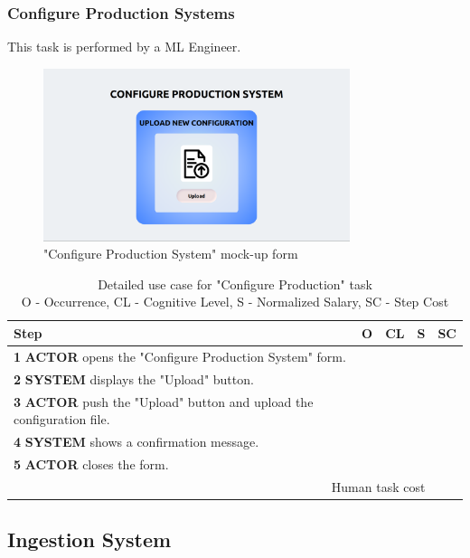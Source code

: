 \subsubsection{Configure Production Systems}
This task is performed by a ML Engineer.

\begin{figure}[H]
\centering
\includegraphics[width=0.8\textwidth]{figures/ui_configure_production.png}
\caption{"Configure Production System" mock-up form}
\end{figure}

\begin{table}[H]
\centering
\begin{tabularx}{\textwidth}{|X|c|c|c|c|}
\hline
\textbf{Step} & \textbf{O} & \textbf{CL} & \textbf{S} & \textbf{SC} \\
\hline
\textbf{1} \textbf{ACTOR} opens the "Configure Production System" form. &  & & & \\
\hline
\textbf{2} \textbf{SYSTEM} displays the "Upload" button.& & & & \\
\hline
\textbf{3} \textbf{ACTOR} push the "Upload" button and upload the configuration file. & & & &\\
\hline
\textbf{4} \textbf{SYSTEM} shows a confirmation message. & & & & \\
\hline
\textbf{5} \textbf{ACTOR} closes the form. & & & & \\
\hline
\multicolumn{4}{|r|}{Human task cost} & \\
\hline
\end{tabularx}
\caption{Detailed use case for "Configure Production" task\\ 
O - Occurrence, CL - Cognitive Level, S - Normalized Salary, SC - Step Cost}
\label{table:configure_production_system}
\end{table}



\subsection{Ingestion System}

